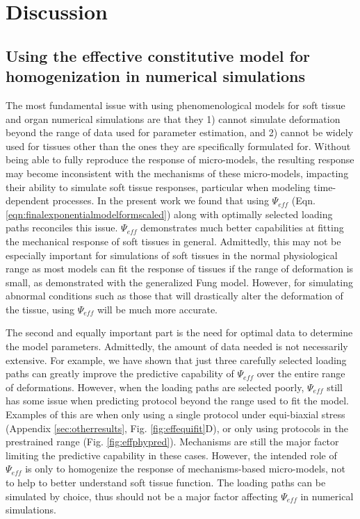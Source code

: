 
\section{Discussion}

\subsection{Using the effective constitutive model for homogenization in numerical simulations}

	The most fundamental issue with using phenomenological models for soft tissue and organ numerical simulations are that they 1) cannot simulate deformation beyond the range of data used for parameter estimation, and 2) cannot be widely used for tissues other than the ones they are specifically formulated for. Without being able to fully reproduce the response of micro-models, the resulting response may become inconsistent with the mechanisms of these micro-models, impacting their ability to simulate soft tissue responses, particular when modeling time-dependent processes. In the present work we found that using $\Psi_{eff}$ (Eqn. \ref{eqn:finalexponentialmodelformscaled}) along with optimally selected loading paths reconciles this issue. $\Psi_{eff}$ demonstrates much better capabilities at fitting the mechanical response of soft tissues in general. Admittedly, this may not be especially important for simulations of soft tissues in the normal physiological range as most models can fit the response of tissues if the range of deformation is small, as demonstrated with the generalized Fung model. However, for simulating abnormal conditions such as those that will drastically alter the deformation of the tissue, using $\Psi_{eff}$ will be much more accurate. 
    
    
    The second and equally important part is the need for optimal data to determine the model parameters. Admittedly, the amount of data needed is not necessarily extensive. For example, we have shown that just three carefully selected loading paths can greatly improve the predictive capability of $\Psi_{eff}$ over the entire range of deformations. However, when the loading paths are selected poorly, $\Psi_{eff}$ still has some issue when predicting protocol beyond the range used to fit the model. Examples of this are when only using a single protocol under equi-biaxial stress (Appendix \ref{sec:otherresults}, Fig. \ref{fig:effequifit}D), or only using protocols in the prestrained range (Fig. \ref{fig:effphypred}). Mechanisms are still the major factor limiting the predictive capability in these cases. However, the intended role of $\Psi_{eff}$ is only to homogenize the response of mechanisms-based micro-models, not to help to better understand soft tissue function. The loading paths can be simulated by choice, thus should not be a major factor affecting $\Psi_{eff}$ in numerical simulations. 
    
